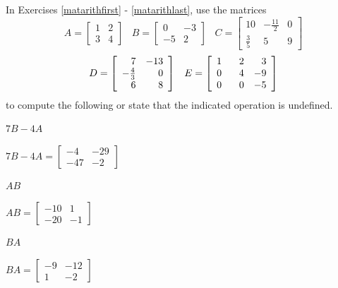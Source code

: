 \documentclass{ximera}
\begin{document}
\begin{question}
In Exercises \ref{matarithfirst} - \ref{matarithlast}, use the matrices \[A = \left[ \begin{array}{rr} 1 & 2 \\ 3 & 4 \end{array} \right] \;\;\; B = \left[ \begin{array}{rr} 0 & -3 \\ -5 & 2 \end{array} \right] \;\;\; C = \left[ \begin{array}{rrr} 10 & -\frac{11}{2} & 0 \\ \frac{3}{5} & 5 & 9 \end{array} \right]\] \[ D = \left[ \begin{array}{rr} 7 & -13 \\ -\frac{4}{3} & 0 \\ 6 & 8 \end{array} \right] \;\;\; E = \left[ \begin{array}{rrr} 1 & \hphantom{-}2 & 3 \\ 0 & 4 & -9 \\ 0 & 0 & -5 \end{array} \right] \] to compute the following or state that the indicated operation is undefined.

\begin{problem}\label{matarithfirst}
$7B - 4A$

\begin{solution}
$7B - 4A = \left[ \begin{array}{rr} -4 & -29 \\ -47 & -2 \end{array} \right]$
\end{solution}
\end{problem}

\begin{problem}
$AB$

\begin{solution}
$AB = \left[ \begin{array}{rr} -10 & 1 \\ -20 & -1 \end{array} \right]$
\end{solution}
\end{problem}

\begin{problem}
$BA$

\begin{solution}
$BA = \left[ \begin{array}{rr} -9 & -12 \\ 1 & -2 \end{array} \right]$
\end{solution}
\end{problem}


\end{question}
\end{document}
